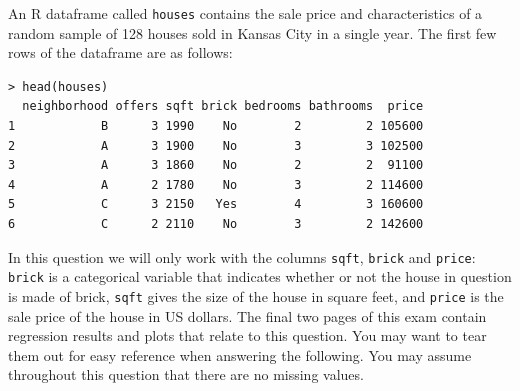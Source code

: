 \documentclass[addpoints,12pt]{exam}
\begin{document}
\begin{questions}

\newpage

\question An R dataframe called \texttt{houses} contains the sale price and characteristics of a random sample of 128 houses sold in Kansas City in a single year. 
The first few rows of the dataframe are as follows:
\begin{verbatim}
> head(houses)
  neighborhood offers sqft brick bedrooms bathrooms  price
1            B      3 1990    No        2         2 105600
2            A      3 1900    No        3         3 102500
3            A      3 1860    No        2         2  91100
4            A      2 1780    No        3         2 114600
5            C      3 2150   Yes        4         3 160600
6            C      2 2110    No        3         2 142600
\end{verbatim}
In this question we will only work with the columns \texttt{sqft}, \texttt{brick} and \texttt{price}: \texttt{brick} is a categorical variable that indicates whether or not the house in question is made of brick, \texttt{sqft} gives the size of the house in square feet, and \texttt{price} is the sale price of the house in US dollars.
The final two pages of this exam contain regression results and plots that relate to this question.
You may want to tear them out for easy reference when answering the following.
You may assume throughout this question that there are no missing values.


\end{questions}
\end{document}
